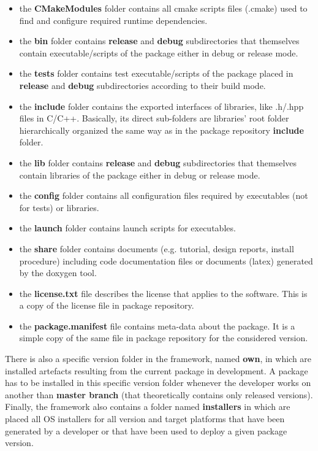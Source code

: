 \documentclass[12pt,a4paper]{article}
\begin{document}
\begin{itemize}
\item the \textbf{CMakeModules} folder contains all cmake scripts files (.cmake) used to find and configure required runtime dependencies.
\item the \textbf{bin} folder contains \textbf{release} and \textbf{debug} subdirectories that themselves contain executable/scripts of the package either in debug or release mode.
\item the \textbf{tests} folder contains test executable/scripts of the package placed in \textbf{release} and \textbf{debug} subdirectories according to their build mode.
\item the \textbf{include} folder contains the exported interfaces of libraries, like .h/.hpp files in C/C++. Basically, its direct sub-folders are libraries' root folder hierarchically organized the same way as in the package repository \textbf{include} folder.
\item the \textbf{lib} folder contains \textbf{release} and \textbf{debug} subdirectories that themselves contain libraries of the package either in debug or release mode.
\item the \textbf{config} folder contains all configuration files required by executables (not for tests) or libraries.
\item the \textbf{launch} folder contains launch scripts for executables.
\item the \textbf{share} folder contains documents (e.g. tutorial, design reports, install procedure) including code documentation files or documents (latex) generated by the doxygen tool.
\item the \textbf{license.txt} file describes the license that applies to the software. This is a copy of the license file in package repository.
\item the \textbf{package.manifest} file contains meta-data about the package. It is a simple copy of the same file in package repository for the considered version.
\end{itemize}
There is also a specific version folder in the framework, named \textbf{own}, in which are installed artefacts resulting from the current package in development. A package has to be installed in this specific version folder whenever the developer works on another than \textbf{master branch} (that theoretically contains only released versions).
Finally, the framework also contains a folder named \textbf{installers} in which are placed all OS installers for all version and target platforms that have been generated by a developer or that have been used to deploy a given package version.
\end{document}
